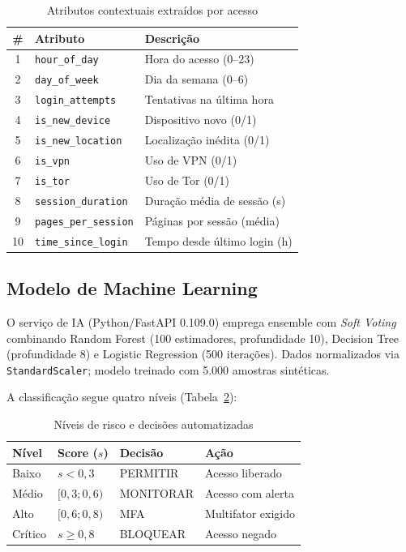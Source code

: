 \documentclass[sigconf,nonacm]{acmart}
\begin{document}
\begin{table}[H]
\caption{Atributos contextuais extraídos por acesso}
\label{tab:features}
\small
\begin{tabular}{@{}clp{4.5cm}@{}}
\toprule
\# & Atributo & Descrição \\
\midrule
1  & \texttt{hour\_of\_day}        & Hora do acesso (0--23) \\
2  & \texttt{day\_of\_week}        & Dia da semana (0--6) \\
3  & \texttt{login\_attempts}      & Tentativas na última hora \\
4  & \texttt{is\_new\_device}      & Dispositivo novo (0/1) \\
5  & \texttt{is\_new\_location}    & Localização inédita (0/1) \\
6  & \texttt{is\_vpn}              & Uso de VPN (0/1) \\
7  & \texttt{is\_tor}              & Uso de Tor (0/1) \\
8  & \texttt{session\_duration}    & Duração média de sessão (s) \\
9  & \texttt{pages\_per\_session}  & Páginas por sessão (média) \\
10 & \texttt{time\_since\_login}   & Tempo desde último login (h) \\
\bottomrule
\end{tabular}
\end{table}

\subsection{Modelo de Machine Learning}

O serviço de IA (Python/FastAPI 0.109.0) emprega ensemble com \textit{Soft Voting} combinando Random Forest (100 estimadores, profundidade 10), Decision Tree (profundidade 8) e Logistic Regression (500 iterações). Dados normalizados via \texttt{StandardScaler}; modelo treinado com 5.000 amostras sintéticas.

A classificação segue quatro níveis (Tabela~\ref{tab:risk}):

\begin{table}[H]
\caption{Níveis de risco e decisões automatizadas}
\label{tab:risk}
\small
\begin{tabular}{@{}llll@{}}
\toprule
Nível & Score ($s$) & Decisão & Ação \\
\midrule
Baixo    & $s < 0{,}3$          & PERMITIR  & Acesso liberado \\
Médio    & $[0{,}3; 0{,}6)$     & MONITORAR & Acesso com alerta \\
Alto     & $[0{,}6; 0{,}8)$     & MFA       & Multifator exigido \\
Crítico  & $s \geq 0{,}8$       & BLOQUEAR  & Acesso negado \\
\bottomrule
\end{tabular}
\end{table}
\end{document}
